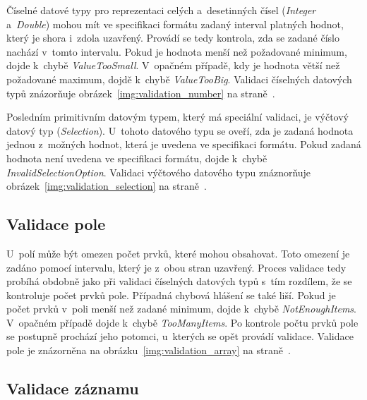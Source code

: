 \documentclass[FM,bw,DP]{tulthesis}
\begin{document}
Číselné datové typy pro reprezentaci celých a~desetinných čísel (\textit{Integer} a~\textit{Double}) mohou mít ve specifikaci formátu zadaný interval platných hodnot, který je shora i~zdola uzavřený. Provádí se tedy kontrola, zda se zadané číslo nachází v~tomto intervalu. Pokud je hodnota menší než požadované minimum, dojde k~chybě \textit{Value\-Too\-Small}. V~opačném případě, kdy je hodnota větší než požadované maximum, dojdě k~chybě \textit{ValueTooBig}. Validaci číselných datových typů znázorňuje obrázek~\ref{img:validation_number} na straně~\pageref{img:validation_number}.

Posledním primitivním datovým typem, který má speciální validaci, je výčtový datový typ (\textit{Selection}). U~tohoto datového typu se oveří, zda je zadaná hodnota jednou z~možných hodnot, která je uvedena ve specifikaci formátu. Pokud zadaná hodnota není uvedena ve specifikaci formátu, dojde k~chybě \textit{InvalidSelectionOption}. Validaci výčtového datového typu znáznorňuje obrázek~\ref{img:validation_selection} na straně~\pageref{img:validation_selection}.

\subsection{Validace pole}

U~polí může být omezen počet prvků, které mohou obsahovat. Toto omezení je zadáno pomocí intervalu, který je z~obou stran uzavřený. Proces validace tedy probíhá obdobně jako při validaci číselných datových typů s~tím rozdílem, že se kontroluje počet prvků pole. Případná chybová hlášení se také liší. Pokud je počet prvků v~poli menší než zadané minimum, dojde k~chybě \textit{NotEnoughItems}. V~opačném případě dojde k~chybě \textit{TooManyItems}. Po kontrole počtu prvků pole se postupně prochází jeho potomci, u~kterých se opět provádí validace. Validace pole je znázorněna na obrázku~\ref{img:validation_array} na straně~\pageref{img:validation_array}.

\subsection{Validace záznamu}
\end{document}
